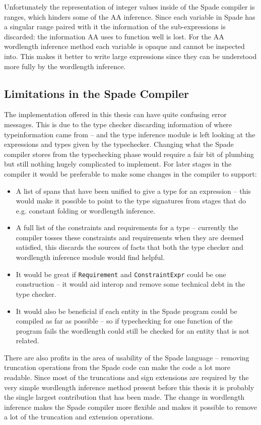 Unfortunately the representation of integer values inside of the Spade compiler is ranges, which hinders some of the AA inference. Since each variable in Spade has a singular range paired with it the information of the sub-expressions is discarded: the information AA uses to function well is lost. For the AA wordlength inference method each variable is opaque and cannot be inspected into. This makes it better to write large expressions since they can be understood more fully by the wordlength inference.

\subsection{Limitations in the Spade Compiler}
The implementation offered in this thesis can have quite confusing error messages. This is due to the type checker discarding information of where typeinformation came from -- and the type inference module is left looking at the expressions and types given by the typechecker. Changing what the Spade compiler stores from the typechecking phase would require a fair bit of plumbing but still nothing hugely complicated to implement. For later stages in the compiler it would be preferable to make some changes in the compiler to support:
\begin{itemize}
  \item A list of spans that have been unified to give a type for an expression -- this would make it possible to point to the type signatures from stages that do e.g. constant folding or wordlength inference.
  \item A full list of the constraints and requirements for a type -- currently the compiler tosses these constraints and requirements when they are deemed satisfied, this discards the sources of facts that both the type checker and wordlength inference module would find helpful.
  \item It would be great if \verb+Requirement+ and \verb+ConstraintExpr+ could be one construction -- it would aid interop and remove some technical debt in the type checker.
  \item It would also be beneficial if each entity in the Spade program could be compiled as far as possible -- so if typechecking for one function of the program fails the wordlength could still be checked for an entity that is not related.
\end{itemize}

There are also profits in the area of usability of the Spade language -- removing truncation operations from the Spade code can make the code a lot more readable. Since most of the truncations and sign extensions are required by the very simple wordlength inference method present before this thesis it is probably the single largest contribution that has been made. The change in wordlength inference makes the Spade compiler more flexible and makes it possible to remove a lot of the truncation and extension operations.

